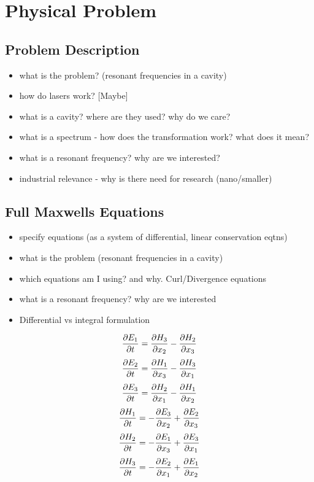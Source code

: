 
\chapter{Physical Problem} %
\label{Chapter1}

\section{Problem Description}

\begin{itemize}
	\item what is the problem? (resonant frequencies in a cavity)
	\item how do lasers work? [Maybe]
	\item what is a cavity? where are they used? why do we care?
	\item what is a spectrum - how does the transformation work? what does it mean?
	\item what is a resonant frequency? why are we interested?
	\item industrial relevance - why is there need for research (nano/smaller)
\end{itemize}
\section{Full Maxwells Equations}
\begin{itemize}
	\item specify equations (as a system of differential, linear conservation eqtns)
	\item what is the problem (resonant frequencies in a cavity)
	\item which equations am I using? and why. Curl/Divergence equations
	\item what is a resonant frequency? why are we interested
	\item Differential vs integral formulation
\end{itemize}
$$ \pdert{E_1} = \pder[H_{3}]{x_2} - \pder[H_{2}]{x_3} $$
$$ \pdert{E_2} = \pder[H_{1}]{x_3} - \pder[H_{3}]{x_1} $$
$$ \pdert{E_3} = \pder[H_{2}]{x_1} - \pder[H_{1}]{x_2} $$
$$ \pdert{H_1} = - \pder[E_{3}]{x_2} + \pder[E_{2}]{x_3} $$
$$ \pdert{H_2} = - \pder[E_{1}]{x_3} + \pder[E_{3}]{x_1} $$
$$ \pdert{H_3} = - \pder[E_{2}]{x_1} + \pder[E_{1}]{x_2} $$


